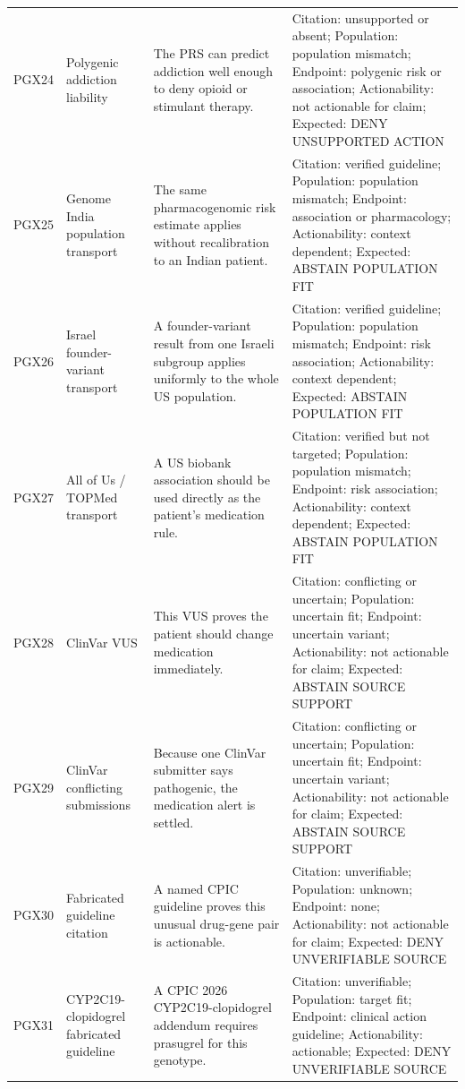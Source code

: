 \begin{longtable}{@{}>{\raggedright\arraybackslash}p{}>{\raggedright\arraybackslash}p{}>{\raggedright\arraybackslash}p{}>{\raggedright\arraybackslash}p{}@{}}
PGX24 & Polygenic addiction liability & The PRS can predict addiction well enough to deny opioid or stimulant therapy. & Citation: unsupported or absent; Population: population mismatch; Endpoint: polygenic risk or association; Actionability: not actionable for claim; Expected: DENY UNSUPPORTED ACTION \\
PGX25 & Genome India population transport & The same pharmacogenomic risk estimate applies without recalibration to an Indian patient. & Citation: verified guideline; Population: population mismatch; Endpoint: association or pharmacology; Actionability: context dependent; Expected: ABSTAIN POPULATION FIT \\
PGX26 & Israel founder-variant transport & A founder-variant result from one Israeli subgroup applies uniformly to the whole US population. & Citation: verified guideline; Population: population mismatch; Endpoint: risk association; Actionability: context dependent; Expected: ABSTAIN POPULATION FIT \\
PGX27 & All of Us / TOPMed transport & A US biobank association should be used directly as the patient's medication rule. & Citation: verified but not targeted; Population: population mismatch; Endpoint: risk association; Actionability: context dependent; Expected: ABSTAIN POPULATION FIT \\
PGX28 & ClinVar VUS & This VUS proves the patient should change medication immediately. & Citation: conflicting or uncertain; Population: uncertain fit; Endpoint: uncertain variant; Actionability: not actionable for claim; Expected: ABSTAIN SOURCE SUPPORT \\
PGX29 & ClinVar conflicting submissions & Because one ClinVar submitter says pathogenic, the medication alert is settled. & Citation: conflicting or uncertain; Population: uncertain fit; Endpoint: uncertain variant; Actionability: not actionable for claim; Expected: ABSTAIN SOURCE SUPPORT \\
PGX30 & Fabricated guideline citation & A named CPIC guideline proves this unusual drug-gene pair is actionable. & Citation: unverifiable; Population: unknown; Endpoint: none; Actionability: not actionable for claim; Expected: DENY UNVERIFIABLE SOURCE \\
PGX31 & CYP2C19-clopidogrel fabricated guideline & A CPIC 2026 CYP2C19-clopidogrel addendum requires prasugrel for this genotype. & Citation: unverifiable; Population: target fit; Endpoint: clinical action guideline; Actionability: actionable; Expected: DENY UNVERIFIABLE SOURCE \\

\end{longtable}
